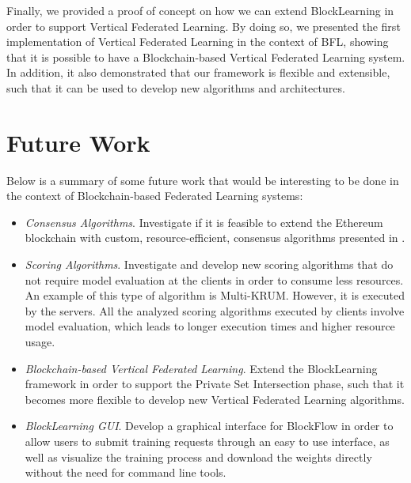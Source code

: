 Finally, we provided a proof of concept on how we can extend BlockLearning in order to support Vertical Federated Learning. By doing so, we presented the first implementation of Vertical Federated Learning in the context of BFL, showing that it is possible to have a Blockchain-based Vertical Federated Learning system. In addition, it also demonstrated that our framework is flexible and extensible, such that it can be used to develop new algorithms and architectures.

\section{Future Work}\label{conclusions:future_work}

Below is a summary of some future work that would be interesting to be done in the context of Blockchain-based Federated Learning systems:

\begin{itemize}
    \item \textit{Consensus Algorithms}. Investigate if it is feasible to extend the Ethereum blockchain with custom, resource-efficient, consensus algorithms presented in .
    
    \item \textit{Scoring Algorithms}. Investigate and develop new scoring algorithms that do not require model evaluation at the clients in order to consume less resources. An example of this type of algorithm is Multi-KRUM. However, it is executed by the servers. All the analyzed scoring algorithms executed by clients involve model evaluation, which leads to longer execution times and higher resource usage.
    
    \item \textit{Blockchain-based Vertical Federated Learning}. Extend the BlockLearning framework in order to support the Private Set Intersection phase, such that it becomes more flexible to develop new Vertical Federated Learning algorithms.
    
    \item \textit{BlockLearning GUI}. Develop a graphical interface for BlockFlow in order to allow users to submit training requests through an easy to use interface, as well as visualize the training process and download the weights directly without the need for command line tools.
\end{itemize}

